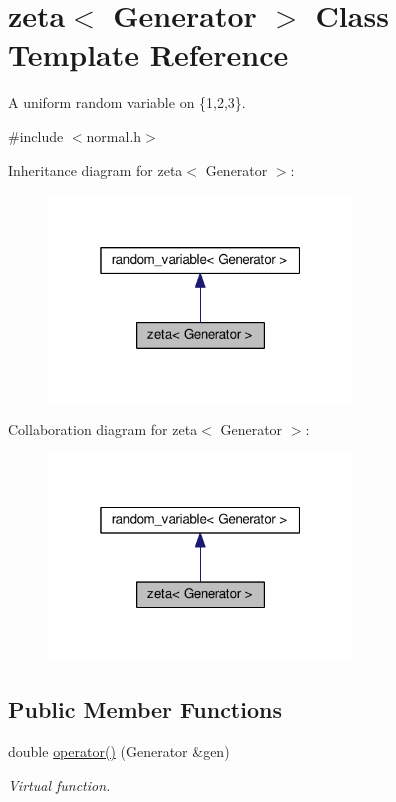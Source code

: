 \hypertarget{classzeta}{}\section{zeta$<$ Generator $>$ Class Template Reference}
\label{classzeta}


A uniform random variable on \{1,2,3\}.  




{\ttfamily \#include $<$normal.\+h$>$}



Inheritance diagram for zeta$<$ Generator $>$\+:\nopagebreak
\begin{figure}[H]
\begin{center}
\leavevmode
\includegraphics[width=229pt]{classzeta__inherit__graph}
\end{center}
\end{figure}


Collaboration diagram for zeta$<$ Generator $>$\+:\nopagebreak
\begin{figure}[H]
\begin{center}
\leavevmode
\includegraphics[width=229pt]{classzeta__coll__graph}
\end{center}
\end{figure}
\subsection*{Public Member Functions}
\begin{DoxyCompactItemize}
\item 
double \hyperlink{classzeta_ad4df70f32566a510f6e4201f722df570}{operator()} (Generator \&gen)\hypertarget{classzeta_ad4df70f32566a510f6e4201f722df570}{}\label{classzeta_ad4df70f32566a510f6e4201f722df570}

\begin{DoxyCompactList}\small\item\em Virtual function. \end{DoxyCompactList}\end{DoxyCompactItemize}
